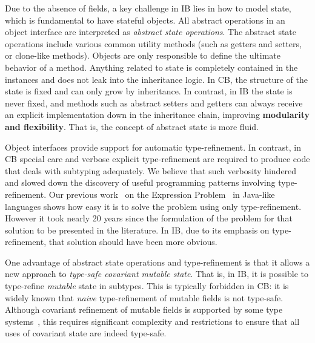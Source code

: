 Due to the absence of fields, a key challenge in IB lies in how to model state, which is
fundamental to have stateful objects. All abstract operations in an
object interface are interpreted as \emph{abstract state
  operations}. The abstract state operations include various common
utility methods (such as getters and setters, or clone-like
methods). Objects are only responsible to define the ultimate
behavior of a method. %
Anything related to state is completely contained in the
instances and does not leak into the inheritance logic.  In CB, the structure of the state is fixed and can only grow
by inheritance.  In contrast, in IB the state is never
fixed, and methods such as abstract setters and getters
can always receive an explicit implementation down in the inheritance
chain, improving \textbf{modularity and flexibility}.  That is, the
concept of abstract state is more fluid.

Object interfaces provide support for automatic type-refinement.  In
contrast, in CB special care and verbose explicit type-refinement are
required to produce code that deals with subtyping adequately. We
believe that such verbosity hindered and slowed down the discovery of
useful programming patterns involving type-refinement. Our previous work~\cite{eptrivially}
on the Expression Problem~\cite{wadler98expression} in Java-like languages shows how
easy it is to solve the problem using only type-refinement. However it
took nearly 20 years since the formulation of the problem for that
solution to be presented in the literature. In IB, due to its emphasis
on type-refinement, that solution should have been more obvious.

One advantage of abstract state operations and
type-refinement is that it allows a new approach to
\emph{type-safe covariant mutable state}. That is, in IB,
it is possible to type-refine \emph{mutable} state in subtypes. This is
typically forbidden in CB: it is widely known that \emph{naive} type-refinement of
mutable fields is not type-safe. Although covariant refinement of mutable
fields is supported by some type systems~\cite{bruce98astatically,bruce1994paradigmatic,ernst06virtual,Saito2013933}, this requires
significant complexity and restrictions to ensure that all uses of
covariant state are indeed type-safe.

\begin{comment}
\marcoT{%

In this paper we show how to support type-safe
\textbf{field removal},
\textbf{field type refinement} allowing a kind of covariant setters refinement,
and \textbf{multiple inheritance}.}
\end{comment}

